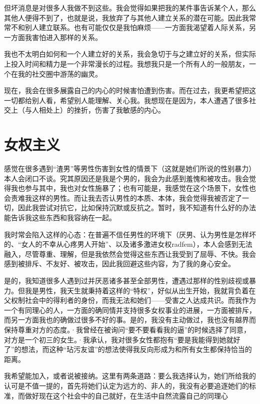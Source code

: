 \documentclass{article}
\begin{document}
    但坏消息是对很多人我做不到这些。我会觉得如果把我的某件事告诉某个人，那么其他人便得不到了，也就是说，我放弃了与其他人建立关系的潜在可能。因此我常常不和别人建立联系。也有可能仅仅是我怕麻烦——一方面我渴望着人际关系，另一方面我害怕进入那样的关系。

    我也不太明白如何和一个人建立好的关系，我会急切于与之建立好的关系，但实际上投入时间和精力是一个非常漫长的过程。我想我只是一个所有人的一般朋友，一个在我的社交圈中游荡的幽灵。

    现在，我会在很多展露自己的内心的时候害怕遭到伤害。而在过去，我更希望把这一切都给别人看，希望别人能理解、关心我。我想现在是因为，本人遭遇了很多社交上（与人相处上）的挫折，伤害了我敏感的内心。

\section{女权主义}
    感觉在很多遇到``渣男''等男性伤害到女性的情景下（这就是她们所说的性别暴力）本人会闭口不谈。究其原因还是我是个男的，我会为此感到羞愧和被攻击。我会觉得我也参与其中，我也对女性施暴了；也有可能是，我感觉在这个场景下，女性也会责难我这样的男性。而让我去否认男性的本质、本体，我会觉得我被否定了一切，因此我尝试对抗它，比如保持沉默或反抗之。暂时，我不知道有什么好的办法能告诉我这些东西和我容纳在一起。

    我时常会陷入这样的心态：在普遍不信任男性的环境下（厌男、认为男性是怎样坏的、``女人的不幸从心疼男人开始''、以及诸多激进女权radfem），本人会感到无法融入，尽管尊重、理解，但是我依然会觉得这些东西让我受到了屈辱、不快。我会感到被排斥、不友好、被攻击，因此我回避这些内容，为了我的身心安全。
    
    是的，我知道很多人遇到过并厌恶诸多甚至全部男性，遭遇过那样的性别歧视或暴力。但我是男性，我天生就秉持着这样的``特权''，好似从出生开始，我就背负着在父权制社会中的得利者的身份，而我无法和她们——受害之人达成共识。而我作为一个有同理心的人，一方面的确同情并支持很多女权事业的进展，一方面被排斥，而另一方面我也的确做过很多不好的事。是的，我没有主动做过，我也没有越界而保持尊重对方的态度。·我曾经在被询问``要不要看看我的逼''的时候选择了同意，对方是一个初三的女生。·我承认，我对很多女性都抱有``要是我能得到她就好了''的想法，而这种``玷污友谊''的想法使得我反向形成为和所有女生都保持恰当的距离。

    我希望能加入，或者说被接纳。这里有两条道路：要么我选择认为，她们所给我的认可是不值一提的，首先将她们认定为远方的、非人的，我没有必要追逐她们的标准，而做好现在这个社会中的自己就好，在生活中自然流露自己的同理心
\end{document}

